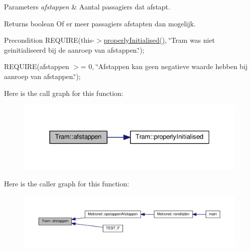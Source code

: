\begin{DoxyParams}{Parameters}
{\em afstappen} & Aantal passagiers dat afstapt. \\
\hline
\end{DoxyParams}
\begin{DoxyReturn}{Returns}
boolean Of er meer passagiers afstapten dan mogelijk. 
\end{DoxyReturn}
\begin{DoxyPrecond}{Precondition}
R\+E\+Q\+U\+I\+RE(this-\/$>$\hyperlink{class_tram_ac2688f590e4db232b4f535c9bf959efb}{properly\+Initialised()}, \char`\"{}\+Tram was niet geinitialiseerd bij de aanroep van afstappen.\char`\"{}); 

R\+E\+Q\+U\+I\+RE(afstappen $>$= 0, \char`\"{}\+Afstappen kan geen negatieve waarde hebben bij aanroep van afstappen.\char`\"{}); 
\end{DoxyPrecond}
Here is the call graph for this function\+:\nopagebreak
\begin{figure}[H]
\begin{center}
\leavevmode
\includegraphics[width=325pt]{class_tram_a81186910caa5212b4a87eec84cd10a46_cgraph}
\end{center}
\end{figure}
Here is the caller graph for this function\+:\nopagebreak
\begin{figure}[H]
\begin{center}
\leavevmode
\includegraphics[width=350pt]{class_tram_a81186910caa5212b4a87eec84cd10a46_icgraph}
\end{center}
\end{figure}
\mbox{\label{class_tram_ae4a7cf6313452140ed54d219d1f6afba}} 
